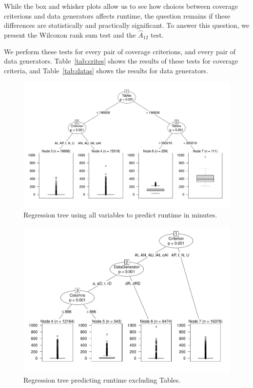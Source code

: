 While the box and whisker plots allow us to see how choices between
coverage criterions and data generators affects runtime, the question
remains if these differences are statistically and practically
significant. To answer this question, we present the Wilcoxon rank sum
test and the $\hat{A}_{12}$ test.  


We perform these tests for every pair
of coverage criterions, and every pair of data generators.
Table~\ref{tab:crites} shows the results of these tests for coverage
criteria, and Table~\ref{tab:datas} shows the results for data
generators.

\begin{figure}
\centering
  \centering
  \includegraphics[width=.75\linewidth]{diagrams/AllTree.pdf}
  \caption{Regression tree using all variables to predict runtime in
  minutes. \vspace{-.15in}}
  \label{fig:atree}
  \vspace{-.15in} 
\end{figure}

\begin{figure}
\centering
  \centering
  \includegraphics[width=.75\linewidth]{diagrams/NoTableCtreesd.pdf}
  \caption{Regression tree predicting runtime excluding Tables.\vspace{-.15in}}
  \label{fig:ttree}
  \vspace{-.15in} 
\end{figure}


